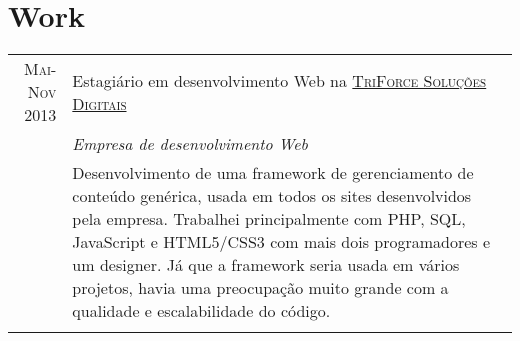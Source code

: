 \documentclass[a4paper,10pt]{article} %
\begin{document}
\begin{tabular}{r|p{11cm}}
\end{tabular}



\section{Work}

\begin{tabular}{r|p{11cm}}
\textsc{Mai-Nov 2013} & Estagiário em desenvolvimento Web na \textsc{\href{http://www.3force.com.br/}{TriForce Soluções Digitais}} \\
& \hfill \hfill \textit{Empresa de desenvolvimento Web} \\
    & \footnotesize{Desenvolvimento de uma framework de gerenciamento de conteúdo genérica, usada em todos os sites desenvolvidos pela empresa. Trabalhei principalmente com PHP, SQL, JavaScript e HTML5/CSS3 com mais dois programadores e um designer. Já que a framework seria usada em vários projetos, havia uma preocupação muito grande com a qualidade e escalabilidade do código.} \\
\multicolumn{2}{c}{} \\

\end{tabular}

\end{document}
